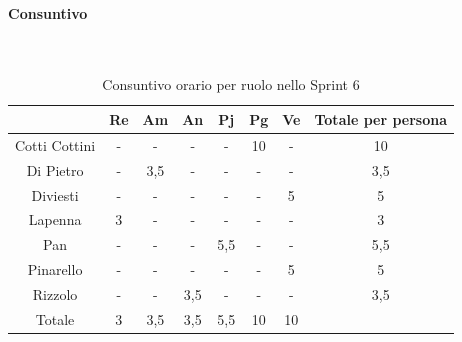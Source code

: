 \documentclass{article}
\begin{document}
                \paragraph{Consuntivo}\mbox{}\\
                \begin{table}[H]
                    \centering
                    \begin{tabular}{|c|c|c|c|c|c|c|c|}
                    \hline
                                    & Re  & Am  & An  & Pj  & Pg  & Ve  & Totale per persona \\ \hline
                    Cotti Cottini & -   & -   & -   & -   & 10  & -   & 10                 \\ \hline
                    Di Pietro     & -   & 3,5 & -   & -   & -   & -   & 3,5                \\ \hline
                    Diviesti      & -   & -   & -   & -   & -   & 5   & 5                  \\ \hline
                    Lapenna       & 3   & -   & -   & -   & -   & -   & 3                  \\ \hline
                    Pan           & -   & -   & -   & 5,5 & -   & -   & 5,5                \\ \hline
                    Pinarello     & -   & -   & -   & -   & -   & 5   & 5                  \\ \hline
                    Rizzolo       & -   & -   & 3,5 & -   & -   & -   & 3,5                \\ \hline
                    Totale        & 3   & 3,5 & 3,5 & 5,5 & 10  & 10  &                    \\ \hline
                    \end{tabular}
                    \caption{Consuntivo orario per ruolo nello Sprint 6}
                \end{table}

\end{document}
